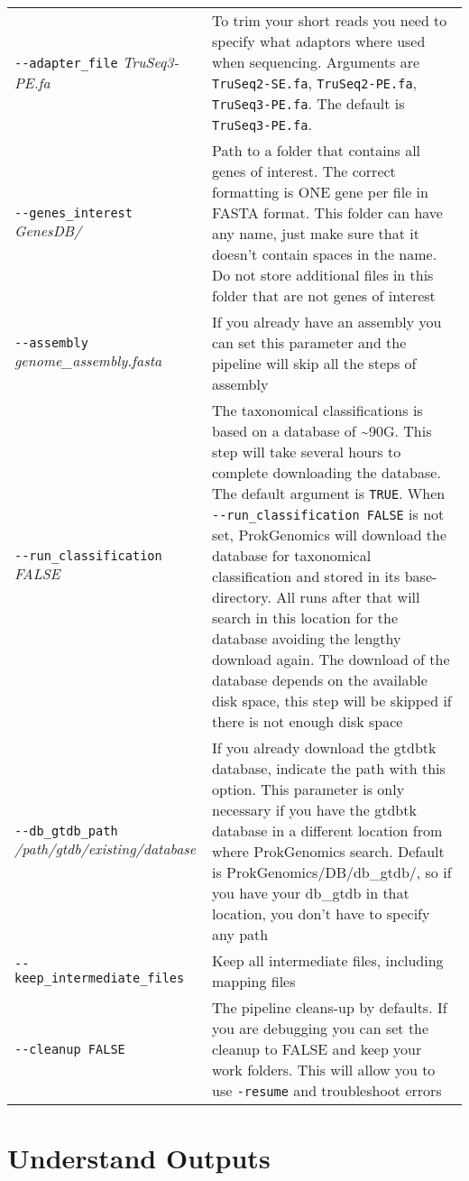 \documentclass[
]{book}
\begin{document}
\begin{longtable}[]{@{}
  >{\raggedright\arraybackslash}p{}
  >{\raggedright\arraybackslash}p{}@{}}
\texttt{-\/-adapter\_file} \emph{TruSeq3-PE.fa} & To trim your short reads you need to specify what adaptors where used when sequencing. Arguments are \texttt{TruSeq2-SE.fa}, \texttt{TruSeq2-PE.fa}, \texttt{TruSeq3-PE.fa}. The default is \texttt{TruSeq3-PE.fa}. \\
\texttt{-\/-genes\_interest} \emph{GenesDB/} & Path to a folder that contains all genes of interest. The correct formatting is ONE gene per file in FASTA format. This folder can have any name, just make sure that it doesn't contain spaces in the name. Do not store additional files in this folder that are not genes of interest \\
\texttt{-\/-assembly} \emph{genome\_assembly.fasta} & If you already have an assembly you can set this parameter and the pipeline will skip all the steps of assembly \\
\texttt{-\/-run\_classification} \emph{FALSE} & The taxonomical classifications is based on a database of \textasciitilde90G. This step will take several hours to complete downloading the database. The default argument is \texttt{TRUE}. When \texttt{-\/-run\_classification\ FALSE} is not set, ProkGenomics will download the database for taxonomical classification and stored in its base-directory. All runs after that will search in this location for the database avoiding the lengthy download again. The download of the database depends on the available disk space, this step will be skipped if there is not enough disk space \\
\texttt{-\/-db\_gtdb\_path} \emph{/path/gtdb/existing/database} & If you already download the gtdbtk database, indicate the path with this option. This parameter is only necessary if you have the gtdbtk database in a different location from where ProkGenomics search. Default is ProkGenomics/DB/db\_gtdb/, so if you have your db\_gtdb in that location, you don't have to specify any path \\
\texttt{-\/-keep\_intermediate\_files} & Keep all intermediate files, including mapping files \\
\texttt{-\/-cleanup\ FALSE} & The pipeline cleans-up by defaults. If you are debugging you can set the cleanup to FALSE and keep your work folders. This will allow you to use \texttt{-resume} and troubleshoot errors \\
\end{longtable}

\hypertarget{understand-outputs}{%
\chapter{Understand Outputs}\label{understand-outputs}}
\end{document}
